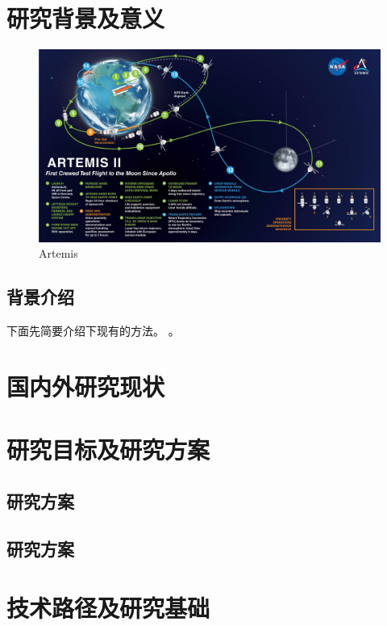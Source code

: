 \documentclass{article}
\begin{document}


%

\newpage
\begin{center}
    \tableofcontents
\end{center}%

\newpage
\section{研究背景及意义}

\begin{figure}[!ht]
  \centering
  \includegraphics[width=0.6\linewidth]{artemis.jpg}
  \caption{Artemis}
  \label{fig:mergesort}
\end{figure}

\subsection{背景介绍}
下面先简要介绍下现有的方法。
\cite{2019space}。

\newpage
\section{国内外研究现状}



\newpage
\section{研究目标及研究方案}
\subsection{研究方案}

\subsection{研究方案}

\newpage
\section{技术路径及研究基础}
\end{document}
